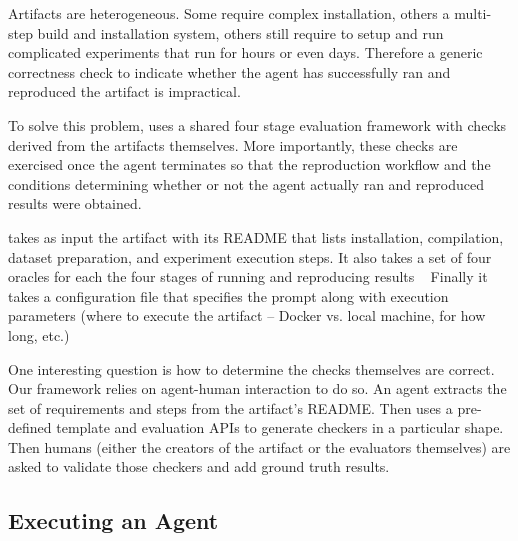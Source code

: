 

Artifacts are heterogeneous.
Some require complex installation,
  others a multi-step build and installation system,
  others still require to setup and run complicated 
  experiments that run for hours or even days.
Therefore a generic correctness check to indicate whether 
  the agent has successfully ran and reproduced the artifact 
  is impractical.

To solve this problem, \aebench uses a shared 
  four stage evaluation framework with 
  checks derived from the artifacts themselves.
More importantly, these checks are exercised once 
  the agent terminates so that the reproduction 
  workflow and the conditions determining whether 
  or not the agent actually ran and reproduced 
  results were obtained.

\aebench takes as input the artifact with its README 
  that lists installation, compilation, dataset preparation, 
  and experiment execution steps.
It also takes a set of four oracles for each the four 
  stages of running and reproducing results 
  ~
Finally it takes a configuration file that specifies the 
  prompt along with execution parameters (where to execute 
  the artifact -- Docker vs. local machine, for how long, etc.)

One interesting question is how to determine the checks themselves 
  are correct.
Our framework relies on agent-human interaction to do so.
An agent extracts the set of requirements and steps from 
  the artifact's README.
Then uses a pre-defined template and evaluation APIs to 
  generate checkers in a particular shape.
Then humans (either the creators of the artifact 
  or the evaluators themselves) are asked to validate 
  those checkers and add ground truth results.


\subsection{Executing an Agent}

